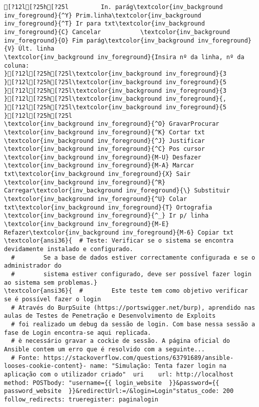 \documentclass{scrartcl}
\begin{document}
\begin{Verbatim}
[?12l[?25h[?25l         In. parág\textcolor{inv_background inv_foreground}{^Y} Prim.linha\textcolor{inv_background inv_foreground}{^T} Ir para txt\textcolor{inv_background inv_foreground}{C} Cancelar           \textcolor{inv_background inv_foreground}{O} Fim parág\textcolor{inv_background inv_foreground}{V} Últ. linha
\textcolor{inv_background inv_foreground}{Insira nº da linha, nº da coluna:                                                                                                         }[?12l[?25h[?25l\textcolor{inv_background inv_foreground}{3
}[?12l[?25h[?25l\textcolor{inv_background inv_foreground}{5
}[?12l[?25h[?25l\textcolor{inv_background inv_foreground}{3
}[?12l[?25h[?25l\textcolor{inv_background inv_foreground}{,
}[?12l[?25h[?25l\textcolor{inv_background inv_foreground}{5
}[?12l[?25h[?25l
\textcolor{inv_background inv_foreground}{^O} GravarProcurar      \textcolor{inv_background inv_foreground}{^K} Cortar txt    \textcolor{inv_background inv_foreground}{^J} Justificar    \textcolor{inv_background inv_foreground}{^C} Pos cursor    \textcolor{inv_background inv_foreground}{M-U} Desfazer     \textcolor{inv_background inv_foreground}{M-A} Marcar txt\textcolor{inv_background inv_foreground}{X} Sair    \textcolor{inv_background inv_foreground}{^R} Carregar\textcolor{inv_background inv_foreground}{\} Substituir    \textcolor{inv_background inv_foreground}{^U} Colar txt\textcolor{inv_background inv_foreground}{T} Ortografia    \textcolor{inv_background inv_foreground}{^_} Ir p/ linha   \textcolor{inv_background inv_foreground}{M-E} Refazer\textcolor{inv_background inv_foreground}{M-6} Copiar txt
\textcolor{ansi36}{  # Teste: Verificar se o sistema se encontra devidamente instalado e configurado.
  #        Se a base de dados estiver correctamente configurada e se o administrador do
  #        sistema estiver configurado, deve ser possível fazer login ao sistema sem problemas.}
\textcolor{ansi36}{  #        Este teste tem como objetivo verificar se é possível fazer o login
  # Através do BurpSuite (https://portswigger.net/burp), aprendido nas aulas de Testes de Penetração e Desenvolvimento de Exploits
  # foi realizado um debug da sessão de login. Com base nessa sessão a fase de Login encontra-se aqui replicada.
  # è necessário gravar a cockie de sessão. A página oficial do Ansible contem um erro que é resolvido com a seguinte...
  # Fonte: https://stackoverflow.com/questions/63791689/ansible-looses-cookie-content}- name: "Simulação: Tenta fazer login na aplicação com o utilizador criado"  uri    url: http://localhost  method: POSTbody: "username={{ login_website  }}&password={{ password_website  }}&redirectUrl:=/&login=Login"status_code: 200    follow_redirects: trueregister: paginalogin

\end{Verbatim}
\end{document}
